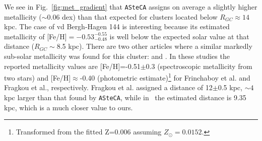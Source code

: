 \documentclass{aa}
\begin{document}
  We see in Fig.~\ref{fig:met_gradient} that \texttt{ASteCA} assigns on
  average a slightly higher metallicity ($\sim$0.06 dex) than that
  expected for clusters located below $R_{GC}\approx14$ kpc.
  The case of vd Bergh-Hagen 144 is interesting because its estimated
  metallicity of [Fe/H]$=-0.53_{-0.48}^{-0.55}$ is well below the expected
  solar value at that distance ($R_{GC}\sim$8.5 kpc). There are two other
  articles where a similar markedly sub-solar metallicity was found
  for this cluster: \cite{Frinchaboy_2006b} and \cite{Fragkou_2019}. In these
  studies the reported metallicity values are [Fe/H]=-0.51$\pm$0.3 
  (spectroscopic metallicity from two stars) and [Fe/H]$\approx$-0.40 (photometric
  estimate)\footnote{Transformed from the fitted Z=0.006 assuming
  $Z_{\odot}=0.0152$.} for Frinchaboy et al. and Fragkou et al., respectively.
  Fragkou et al. assigned a distance of 12$\pm$0.5 kpc, $\sim4$ kpc
  larger than that found by \texttt{ASteCA}, while in~\cite{Frinchaboy_2004}
  the estimated distance is 9.35 kpc, which is a much closer value to ours.
\end{document}
